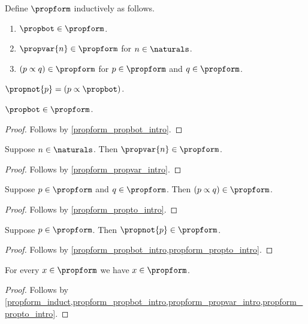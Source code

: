 



\begin{datatype}\label{propform}
    Define $\propform$ inductively as follows.
    \begin{enumerate}
        \item $\propbot \in \propform$.
        \item $\propvar{n} \in \propform$ for $n \in \naturals$.
        \item $(p \propto q) \in \propform$ for $p \in \propform$ and $q \in \propform$.
    \end{enumerate}
\end{datatype}

\begin{abbreviation}\label{propnot}
    $\propnot{p} = (p \propto \propbot)$.
\end{abbreviation}

\begin{proposition}\label{propform_bot_intro}
    $\propbot \in \propform$.
\end{proposition}
\begin{proof}
    Follows by \cref{propform_propbot_intro}.
\end{proof}

\begin{proposition}\label{propform_var_intro}
    Suppose $n \in \naturals$.
    Then $\propvar{n} \in \propform$.
\end{proposition}
\begin{proof}
    Follows by \cref{propform_propvar_intro}.
\end{proof}

\begin{proposition}\label{propform_imp_intro}
    Suppose $p \in \propform$ and $q \in \propform$.
    Then $(p \propto q) \in \propform$.
\end{proposition}
\begin{proof}
    Follows by \cref{propform_propto_intro}.
\end{proof}

\begin{proposition}\label{propnot_intro}
    Suppose $p \in \propform$.
    Then $\propnot{p} \in \propform$.
\end{proposition}
\begin{proof}
    Follows by \cref{propform_propbot_intro,propform_propto_intro}.
\end{proof}

\begin{proposition}\label{propform_induction_sanity}
    For every $x \in \propform$ we have $x \in \propform$.
\end{proposition}
\begin{proof}
    Follows by \cref{propform_induct,propform_propbot_intro,propform_propvar_intro,propform_propto_intro}.
\end{proof}

